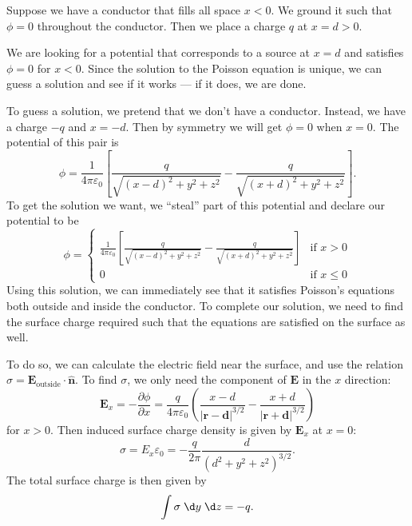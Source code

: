 \documentclass[a4paper]{article}
\begin{document}
\begin{eg}
  Suppose we have a conductor that fills all space $x < 0$. We ground it such that $\phi = 0$ throughout the conductor. Then we place a charge $q$ at $x = d > 0$.
  \begin{center}
  \end{center}
  We are looking for a potential that corresponds to a source at $x = d$ and satisfies $\phi = 0$ for $x < 0$. Since the solution to the Poisson equation is unique, we can guess a solution and see if it works --- if it does, we are done.

  To guess a solution, we pretend that we don't have a conductor. Instead, we have a charge $-q$ and $x = -d$. Then by symmetry we will get $\phi = 0$ when $x = 0$. The potential of this pair is
  \[
    \phi = \frac{1}{4\pi\varepsilon_0}\left[\frac{q}{\sqrt{(x - d)^2 + y^2 + z^2}} - \frac{q}{\sqrt{(x + d)^2 + y^2 + z^2}}\right].
  \]
  To get the solution we want, we ``steal'' part of this potential and declare our potential to be
  \[
    \phi =
    \begin{cases}
      \frac{1}{4\pi\varepsilon_0}\left[\frac{q}{\sqrt{(x - d)^2 + y^2 + z^2}} - \frac{q}{\sqrt{(x + d)^2 + y^2 + z^2}}\right] & \text{if }x > 0\\
    0 & \text{if }x \leq 0
    \end{cases}
  \]
  Using this solution, we can immediately see that it satisfies Poisson's equations both outside and inside the conductor. To complete our solution, we need to find the surface charge required such that the equations are satisfied on the surface as well.

  To do so, we can calculate the electric field near the surface, and use the relation $\sigma = \mathbf{E}_\text{outside}\cdot \hat{\mathbf{n}}$. To find $\sigma$, we only need the component of $\mathbf{E}$ in the $x$ direction:
  \[
    \mathbf{E}_x = -\frac{\partial \phi}{\partial x} = \frac{q}{4\pi\varepsilon_0}\left(\frac{x - d}{|\mathbf{r} - \mathbf{d}|^{3/2}} - \frac{x + d}{|\mathbf{r} + \mathbf{d}|^{3/2}}\right)
  \]
  for $x > 0$. Then induced surface charge density is given by $\mathbf{E}_x$ at $x = 0$:
  \[
    \sigma = E_x\varepsilon_0 = -\frac{q}{2\pi}\frac{d}{(d^2 + y^2 + z^2)^{3/2}}.
  \]
  The total surface charge is then given by
  \[
    \int \sigma \;\d y\;\d z = -q.
  \]
\end{eg}
\end{document}
